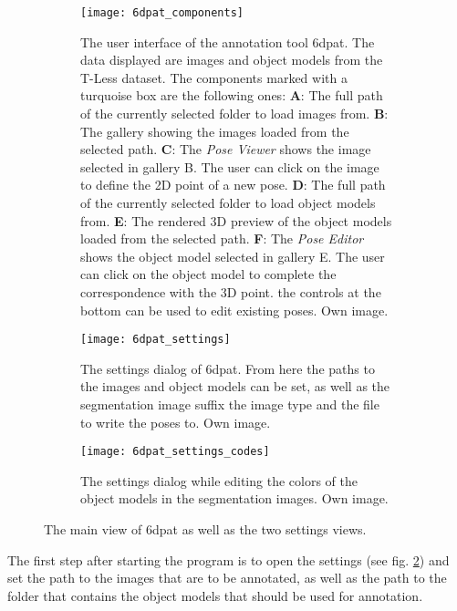 \begin{figure}[!tbp]
	\centering
	\begin{subfigure}[t]{\textwidth}
		\centering
    	\texttt{[image: 6dpat\_components]}
    	\caption{The user interface of the annotation tool \gls{6dpat}. The data displayed are images and object models from the T-Less dataset. The components marked with a turquoise box are the following ones: \textbf{A}: The full path of the currently selected folder to load images from. \textbf{B}: The gallery showing the images loaded from the selected path. \textbf{C}: The \textit{Pose Viewer} shows the image selected in gallery B. The user can click on the image to define the 2D point of a new pose. \textbf{D}: The full path of the currently selected folder to load object models from. \textbf{E}: The rendered 3D preview of the object models loaded from the selected path. \textbf{F}: The \textit{Pose Editor} shows the object model selected in gallery E. The user can click on the object model to complete the correspondence with the 3D point. the controls at the bottom can be used to edit existing poses. Own image.}
    	\label{fig:6dpat_components}
	\end{subfigure}
	\par\bigskip
	\begin{subfigure}[t]{0.47\textwidth}
		\centering
    	\texttt{[image: 6dpat\_settings]}
    	\caption{The settings dialog of \gls{6dpat}. From here the paths to the images and object models can be set, as well as the segmentation image suffix the image type and the file to write the poses to. Own image.}
    	\label{fig:6dpat_settings}
	\end{subfigure}
	\hfill
	\begin{subfigure}[t]{0.47\textwidth}
	\centering
    	\texttt{[image: 6dpat\_settings\_codes]}
    	\caption{The settings dialog while editing the colors of the object models in the segmentation images. Own image.}
    	\label{fig:6dpat_settings_codes}
	\end{subfigure}
	\caption{The main view of \gls{6dpat} as well as the two settings views.}
	\label{fig:6dpat_ui_overview}
\end{figure}

The first step after starting the program is to open the settings (see fig. \ref{fig:6dpat_settings}) and set the path to the images that are to be annotated, as well as the path to the folder that contains the object models that should be used for annotation. 

